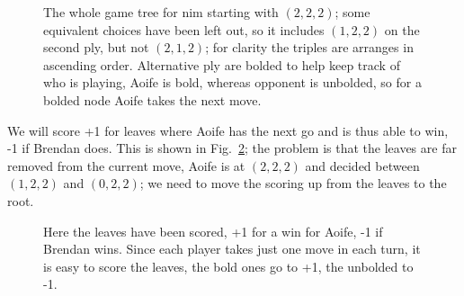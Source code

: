 \documentclass[11pt,a4paper]{scrartcl}
\begin{document}
{\begin{figure}
\begin{center}
\end{center}
\caption{The whole game tree for nim starting with $(2,2,2)$; some
  equivalent choices have been left out, so it includes $(1,2,2)$ on
  the second ply, but not $(2,1,2)$; for clarity the triples are
  arranges in ascending order. Alternative ply are bolded to help keep
  track of who is playing, Aoife is bold, whereas opponent is
  unbolded, so for a bolded node Aoife takes the next
  move. \label{fig:nim}}
\end{figure}


We will score +1 for leaves where Aoife has the next go and is thus
able to win, -1 if Brendan does. This is shown in
Fig.~\ref{fig:nim-leaves}; the problem is that the leaves are far
removed from the current move, Aoife is at $(2,2,2)$ and decided
between $(1,2,2)$ and $(0,2,2)$; we need to move the scoring up from
the leaves to the root.



\begin{figure}
\begin{center}
\end{center}
\caption{Here the leaves have been scored, +1 for a win for Aoife, -1
  if Brendan wins. Since each player takes just one move in each turn,
  it is easy to score the leaves, the bold ones go to +1, the unbolded
  to -1.\label{fig:nim-leaves}}
\end{figure}

}
\end{document}
